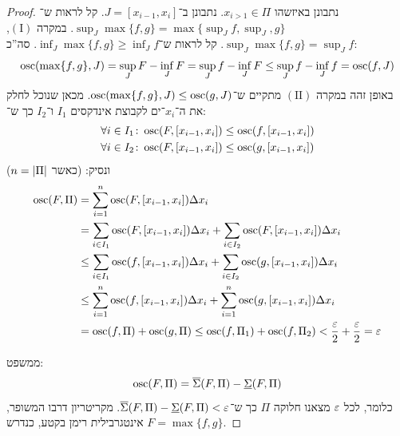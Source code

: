 \documentclass[]{../../../../tex/classes/homework}
\begin{document}
\begin{enumerate}[(A)]
\begin{proof}
			נתבונן באיזשהו $x_{i>1} \in \Pi$. נתבונן ב־$J = [x_{i - 1}, x_i]$. קל לראות ש־$\sup_{J}\max\{f, g\} = \max\{\sup_J f, \sup_J, g\}$. במקרה $(\mathrm I)$, $\sup_J \max\{f, g\} = \sup_J f$. קל לראות ש־$\inf_J \max \{f, g\} \ge \inf_J f$. סה''כ: 
			\[ \operatorname{osc}(\max\{f, g\}, J) = \sup_J F - \inf_J F = \sup_J f - \inf_JF \le \sup_J f - \inf_J f = \operatorname{osc}(f, J)  \]
			באופן זהה במקרה $(\mathrm {II})$ מתקיים ש־$\operatorname{osc}(\max\{f, g\}, J) \le \operatorname{osc}(g, J)$. מכאן שנוכל לחלק את ה־$x_i$־ים לקבוצת אינדקסים $I_1$ ו־$I_2$ כך ש־: 
			\begin{align*}
				\forall i \in I_1 &\colon \operatorname{osc}(F, [x_{i - 1}, x_i]) \le \operatorname{osc}(f, [x_{i - 1}, x_i]) \\
				\forall i \in I_2 &\colon \operatorname{osc}(F, [x_{i - 1}, x_i]) \le \operatorname{osc}(g, [x_{i - 1}, x_i])
			\end{align*}
			ונסיק: (כאשר $n = \left \lvert \Pi \right \rvert$)
			\begin{align*}
				\osc(F, \Pi) &= \sum_{i = 1}^{n}\osc(F, [x_{i - 1}, x_i])\Delta x_i \\
				&= \sum_{i \in I_1}\osc(F, [x_{i - 1}, x_i])\Delta x_i + \sum_{i \in I_2}\osc(F, [x_{i - 1}, x_i])\Delta x_i \\
				&\le \sum_{i \in I_1}\osc(f, [x_{i - 1}, x_i])\Delta x_i + \sum_{i \in I_2}\osc(g, [x_{i - 1}, x_i])\Delta x_i \\
				&\le \sum_{i = 1}^{n}\osc(f, [x_{i - 1}, x_i])\Delta x_i + \sum_{i = 1}^{n}\osc(g, [x_{i - 1}, x_i])\Delta x_i \\
				&= \osc(f, \Pi) + \osc(g, \Pi) \le \osc(f, \Pi_1) + \osc(f, \Pi_2) < \frac{\eg}{2} + \frac{\eg}{2} = \eg
			\end{align*}
			
			ממשפט: 
			\[ \operatorname{osc}(F, \Pi) = \overline{\Sigma}(F, \Pi) - \underline{\Sigma}(F, \Pi) \]
			כלומר, לכל $\eg$ מצאנו חלוקה $\Pi$ כך ש־$\daru(F, \Pi) - \dard(F, \Pi) < \eg$. מקריטריון דרבו המשופר, $F = \max \{f, g\}$ אינטגרבילית רימן בקטע, כנדרש. 
		\end{proof}
	\end{enumerate}
	
\end{document}
